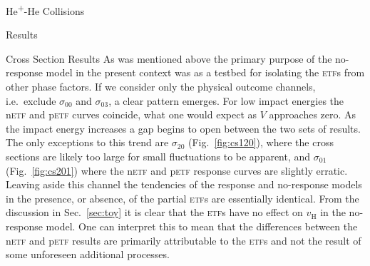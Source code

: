\documentclass[a5paper, 9 pt]{extreport}
\begin{document}
\begin{chapter}{\texorpdfstring{He\textsuperscript{+}}{He+}-He Collisions \label{chap:hephe}}
\begin{section}{Results \label{sec:hephe-disc}}
\begin{subsection}{Cross Section Results \label{sec:hephe-res}}
         As was mentioned above the primary purpose of the no-response model in the present context was
         as a testbed for isolating the \textsc{etf}s from other phase factors. If we consider only the
         physical outcome channels, i.e.\ exclude $\sigma_{00}$ and $\sigma_{03}$, a clear pattern
         emerges. For low impact energies the n\textsc{etf} and p\textsc{etf} curves coincide, what one
         would expect as $V$ approaches zero. As the impact energy increases a gap begins to open
         between the two sets of results. The only exceptions to this trend are $\sigma_{20}$
         (Fig.~\ref{fig:cs120}), where the cross sections are likely too large for small fluctuations to
         be apparent, and $\sigma_{01}$ (Fig.~\ref{fig:cs201}) where the n\textsc{etf} and p\textsc{etf}
         response curves are slightly erratic. Leaving aside this channel the tendencies of the response
         and no-response models in the presence, or absence, of the partial \textsc{etf}s are
         essentially identical. From the discussion in Sec.~\ref{sec:toy} it is clear that the
         \textsc{etf}s have no effect on $v_\mathrm{H}$ in the no-response model. One can interpret this
         to mean that the differences between the n\textsc{etf} and p\textsc{etf} results are primarily
         attributable to the \textsc{etf}s and not the result of some unforeseen additional processes.


\end{subsection}
\end{section}
\end{chapter}
\end{document}
